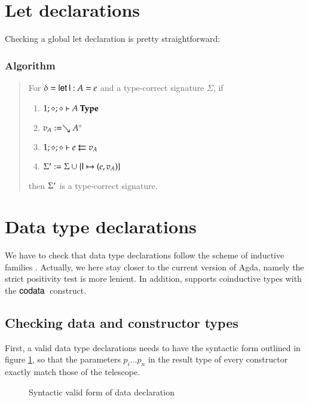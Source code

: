 \clearpage

\section{Let declarations}
Checking a global let declaration is pretty straightforward:

\subsubsection{Algorithm}
\begin{quote} 
For $ \delta = \clet \dd : A = e $ and a type-correct signature $\Sigma$, if 
\begin{enumerate}
\item
$\IsType{1}{\diamond}{\diamond}{A}$ 
\item
$ v_A := \wh \cl{A}{\diamond}$
\item
$\Check{1}{\diamond}{\diamond}{e}{v_A}$ 
\item
$\Sig' := \Sig \cup \{\dd \mapsto (e,v_A)\}$
\end{enumerate}
then $\Sig'$ is a type-correct signature.
\end{quote}
\section{Data type declarations}
We have to check that data type declarations follow the scheme of inductive families \cite{dybjer94inductive}.
Actually, we here stay closer to the current version of Agda, namely the strict positivity test is more lenient. In addition, \mugda supports coinductive types \cite{coquand-infinite,gimenez98tutorial} with the $\codata$ construct.


\subsection{Checking data and constructor types}

First, a valid data type declarations needs to have the syntactic form outlined in figure \ref{syn},
so that the parameters $p_i \ldots p_n$ in the result type of every constructor exactly match those of the telescope. 

\begin{figure}[htp]
\caption{Syntactic valid form of data declaration}
\label{syn}
\end{figure}


